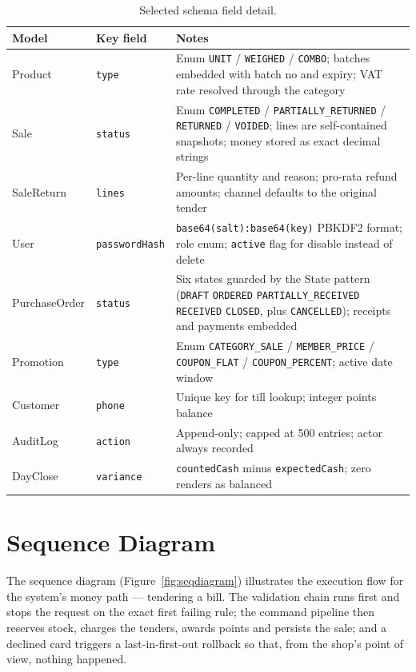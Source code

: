 \documentclass[12pt,a4paper]{report}
\begin{document}
\begin{table}[H]
\centering
\caption{Selected schema field detail.}
\label{tab:schema}
\small
\begin{tabularx}{\textwidth}{l l X}
\toprule
\textbf{Model} & \textbf{Key field} & \textbf{Notes} \\
\midrule
Product & \texttt{type} & Enum \texttt{UNIT} / \texttt{WEIGHED} / \texttt{COMBO};
batches embedded with batch no and expiry; VAT rate resolved through the category \\
Sale & \texttt{status} & Enum \texttt{COMPLETED} / \texttt{PARTIALLY\_RETURNED} /
\texttt{RETURNED} / \texttt{VOIDED}; lines are self-contained snapshots; money stored as
exact decimal strings \\
SaleReturn & \texttt{lines} & Per-line quantity and reason; pro-rata refund amounts;
channel defaults to the original tender \\
User & \texttt{passwordHash} & \texttt{base64(salt):base64(key)} PBKDF2 format; role
enum; \texttt{active} flag for disable instead of delete \\
PurchaseOrder & \texttt{status} & Six states guarded by the State pattern
(\texttt{DRAFT} \textrightarrow{} \texttt{ORDERED} \textrightarrow{}
\texttt{PARTIALLY\_RECEIVED} \textrightarrow{} \texttt{RECEIVED} \textrightarrow{}
\texttt{CLOSED}, plus \texttt{CANCELLED}); receipts and payments embedded \\
Promotion & \texttt{type} & Enum \texttt{CATEGORY\_SALE} / \texttt{MEMBER\_PRICE} /
\texttt{COUPON\_FLAT} / \texttt{COUPON\_PERCENT}; active date window \\
Customer & \texttt{phone} & Unique key for till lookup; integer points balance \\
AuditLog & \texttt{action} & Append-only; capped at 500 entries; actor always recorded \\
DayClose & \texttt{variance} & \texttt{countedCash} minus \texttt{expectedCash}; zero
renders as balanced \\
\bottomrule
\end{tabularx}
\end{table}

\section{Sequence Diagram}
The sequence diagram (Figure~\ref{fig:seqdiagram}) illustrates the execution flow for
the system's money path --- tendering a bill. The validation chain runs first and stops
the request on the exact first failing rule; the command pipeline then reserves stock,
charges the tenders, awards points and persists the sale; and a declined card triggers a
last-in-first-out rollback so that, from the shop's point of view, nothing happened.
\end{document}
